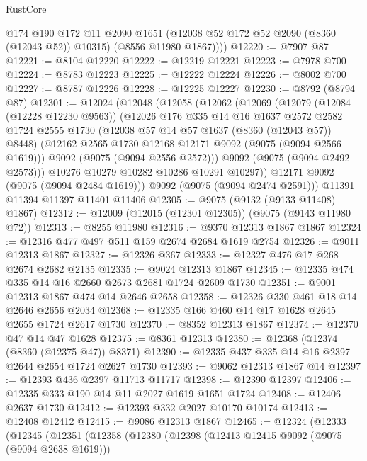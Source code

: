 \begin{lexlean}{RustCore}
\begin{coremodule}
          @174
          @190
          @172
          @11
          @2090
          @1651
          (@12038 @52 @172 @52 @2090 (@8360 (@12043 @52)) @10315)
          (@8556 @11980 @1867))))
@12220 := @7907 @87
@12221 := @8104 @12220
@12222 := @12219 @12221
@12223 := @7978 @700
@12224 := @8783 @12223
@12225 := @12222 @12224
@12226 := @8002 @700
@12227 := @8787 @12226
@12228 := @12225 @12227
@12230 := @8792 (@8794 @87)
@12301 := @12024
    (@12048
      (@12058
        (@12062
          (@12069
            (@12079
              (@12084 (@12228 @12230 @9563))
              (@12026
                @176
                @335
                @14
                @16
                @1637
                @2572
                @2582
                @1724
                @2555
                @1730
                (@12038 @57 @14 @57 @1637 (@8360 (@12043 @57)) @8448)
                (@12162 @2565 @1730 @12168 @12171 @9092 (@9075 (@9094 @2566 @1619)))
                @9092
                (@9075 (@9094 @2556 @2572)))
              @9092
              (@9075 (@9094 @2492 @2573)))
            @10276
            @10279
            @10282
            @10286
            @10291
            @10297))
        @12171
        @9092
        (@9075 (@9094 @2484 @1619)))
      @9092
      (@9075 (@9094 @2474 @2591)))
    @11391
    @11394
    @11397
    @11401
    @11406
@12305 := @9075 (@9132 (@9133 @11408) @1867)
@12312 := @12009 (@12015 (@12301 @12305)) (@9075 (@9143 @11980 @72))
@12313 := @8255 @11980
@12316 := @9370 @12313 @1867 @1867
@12324 := @12316 @477 @497 @511 @159 @2674 @2684 @1619 @2754
@12326 := @9011 @12313 @1867
@12327 := @12326 @367
@12333 := @12327 @476 @17 @268 @2674 @2682 @2135
@12335 := @9024 @12313 @1867
@12345 := @12335 @474 @335 @14 @16 @2660 @2673 @2681 @1724 @2609 @1730
@12351 := @9001 @12313 @1867 @474 @14 @2646 @2658
@12358 := @12326 @330 @461 @18 @14 @2646 @2656 @2034
@12368 := @12335 @166 @460 @14 @17 @1628 @2645 @2655 @1724 @2617 @1730
@12370 := @8352 @12313 @1867
@12374 := @12370 @47 @14 @47 @1628
@12375 := @8361 @12313
@12380 := @12368 (@12374 (@8360 (@12375 @47)) @8371)
@12390 := @12335 @437 @335 @14 @16 @2397 @2644 @2654 @1724 @2627 @1730
@12393 := @9062 @12313 @1867 @14
@12397 := @12393 @436 @2397 @11713 @11717
@12398 := @12390 @12397
@12406 := @12335 @333 @190 @14 @11 @2027 @1619 @1651 @1724
@12408 := @12406 @2637 @1730
@12412 := @12393 @332 @2027 @10170 @10174
@12413 := @12408 @12412
@12415 := @9086 @12313 @1867
@12465 := @12324
    (@12333
      (@12345
        (@12351
          (@12358
            (@12380
              (@12398
                (@12413 @12415 @9092 (@9075 (@9094 @2638 @1619)))

\end{coremodule}
\end{lexlean}
